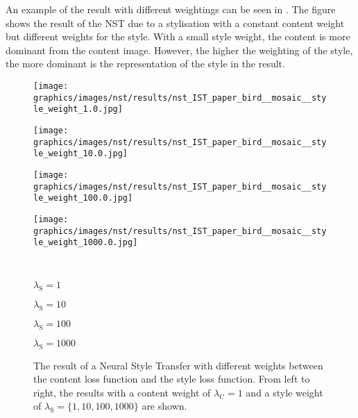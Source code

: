 An example of the result with different weightings can be seen in . The figure shows the result of the \gls{NST} due to a stylisation with a constant content weight but different weights for the style. With a small style weight, the content is more dominant from the content image. However, the higher the weighting of the style, the more dominant is the representation of the style in the result.
\begin{figure}[h]
	\centering
	\begin{minipage}{.25\textwidth}
		\centering
		\texttt{[image: graphics/images/nst/results/nst\_IST\_paper\_bird\_\_mosaic\_\_style\_weight\_1.0.jpg]}
	\end{minipage}%
	\begin{minipage}{.25\textwidth}
		\centering
		\texttt{[image: graphics/images/nst/results/nst\_IST\_paper\_bird\_\_mosaic\_\_style\_weight\_10.0.jpg]}
	\end{minipage}%
	\begin{minipage}{.25\textwidth}
		\centering
		\texttt{[image: graphics/images/nst/results/nst\_IST\_paper\_bird\_\_mosaic\_\_style\_weight\_100.0.jpg]}
	\end{minipage}%
	\begin{minipage}{.25\textwidth}
		\centering
		\texttt{[image: graphics/images/nst/results/nst\_IST\_paper\_bird\_\_mosaic\_\_style\_weight\_1000.0.jpg]}
	\end{minipage}\\ \vspace{0.15cm}
	\begin{minipage}{.25\textwidth}
		\centering
		$\lambda_\text{S} = 1$
	\end{minipage}%
	\begin{minipage}{.25\textwidth}
		\centering
		$\lambda_\text{S} = 10$
	\end{minipage}%
	\begin{minipage}{.25\textwidth}
		\centering
		$\lambda_\text{S} = 100$
	\end{minipage}%
	\begin{minipage}{.25\textwidth}
		\centering
		$\lambda_\text{S} = 1000$
	\end{minipage}
	\caption{The result of a Neural Style Transfer with different weights between the content loss function and the style loss function. From left to right, the results with a content weight of $\lambda_\text{C} = 1$ and a style weight of  $\lambda_\text{S} = \{1, 10, 100, 1000\}$ are shown.}
	\label{fig:weighting_nst}
\end{figure}

